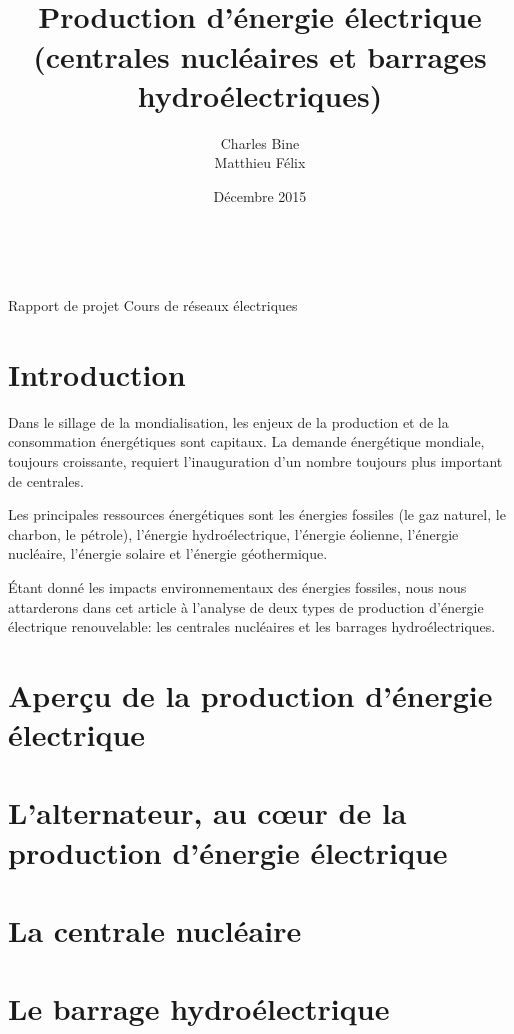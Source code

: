 \documentclass[12pt,a4paper,oneside,openany]{memoir}
\author{Charles Bine\\Matthieu Félix}
\title{\\Production d'énergie électrique (centrales nucléaires et barrages hydroélectriques)}
\date{Décembre 2015}
\begin{document}
	
\keepthetitle
\begin{titlingpage}
\noindent
\begin{minipage}[t]{0.4\textwidth} \begin{flushleft}
\theauthor \\ \thedate
\end{flushleft} \end{minipage}
\begin{minipage}[t]{0.4\textwidth} \begin{flushright}
Rapport de projet
Cours de réseaux électriques
\end{flushright} \end{minipage}

\vspace{3cm}
\begin{center}
{\LARGE \textsc{\thetitle}}
\end{center}
\vspace{3cm}

\end{titlingpage}

\addtolength{\marginparwidth}{11mm}
\abnormalparskip{4mm}

\clearpage

\tableofcontents

\clearpage


\chapter{Introduction}

Dans le sillage de la mondialisation, les enjeux de la production et de la consommation énergétiques sont capitaux. La demande énergétique mondiale, toujours croissante, requiert l'inauguration d'un nombre toujours plus important de centrales. 

Les principales ressources énergétiques sont les énergies fossiles (le gaz naturel, le charbon, le pétrole), l’énergie hydroélectrique, l’énergie éolienne, l’énergie nucléaire, l’énergie solaire et l'énergie géothermique. 

Étant donné les impacts environnementaux des énergies fossiles, nous nous attarderons dans cet article à l'analyse de deux types de production d'énergie électrique renouvelable: les centrales nucléaires et les barrages hydroélectriques. 


\chapter{Aperçu de la production d'énergie électrique}




\chapter{L'alternateur, au cœur de la production d'énergie électrique}

\chapter{La centrale nucléaire}

\chapter{Le barrage hydroélectrique}
\end{document}
